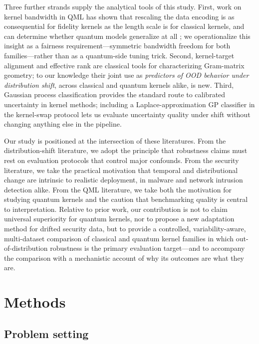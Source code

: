 \documentclass[journal]{IEEEtran}
\begin{document}
Three further strands supply the analytical tools of this study. First, work on kernel bandwidth in QML has shown that rescaling the data encoding is as consequential for fidelity kernels as the length scale is for classical kernels, and can determine whether quantum models generalize at all \cite{shaydulin2022bandwidth,canatar2023bandwidth}; we operationalize this insight as a fairness requirement---symmetric bandwidth freedom for both families---rather than as a quantum-side tuning trick. Second, kernel-target alignment \cite{cristianini2001kta,cortes2012centeredalignment} and effective rank \cite{roy2007effective} are classical tools for characterizing Gram-matrix geometry; to our knowledge their joint use as \emph{predictors of OOD behavior under distribution shift}, across classical and quantum kernels alike, is new. Third, Gaussian process classification \cite{rasmussen2006gpml} provides the standard route to calibrated uncertainty in kernel methods; including a Laplace-approximation GP classifier in the kernel-swap protocol lets us evaluate uncertainty quality under shift without changing anything else in the pipeline.

Our study is positioned at the intersection of these literatures. From the distribution-shift literature, we adopt the principle that robustness claims must rest on evaluation protocols that control major confounds. From the security literature, we take the practical motivation that temporal and distributional change are intrinsic to realistic deployment, in malware and network intrusion detection alike. From the QML literature, we take both the motivation for studying quantum kernels and the caution that benchmarking quality is central to interpretation. Relative to prior work, our contribution is not to claim universal superiority for quantum kernels, nor to propose a new adaptation method for drifted security data, but to provide a controlled, variability-aware, multi-dataset comparison of classical and quantum kernel families in which out-of-distribution robustness is the primary evaluation target---and to accompany the comparison with a mechanistic account of why its outcomes are what they are.

\section{Methods}
\label{sec:methods}

\subsection{Problem setting}
\end{document}
